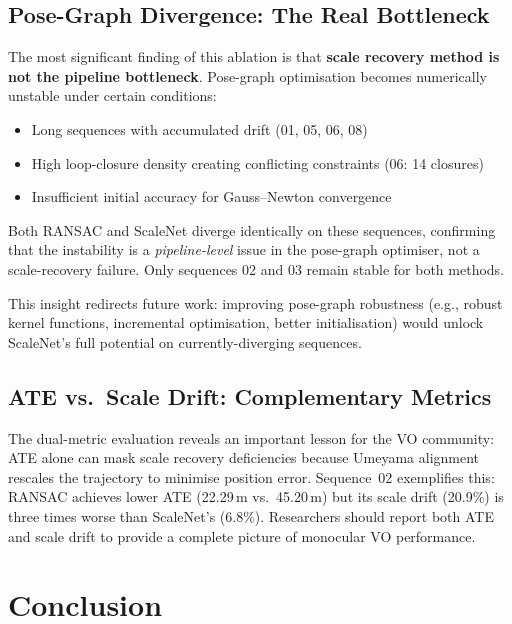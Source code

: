 \documentclass[12pt,a4paper]{article}
\begin{document}
\subsection{Pose-Graph Divergence: The Real Bottleneck}

The most significant finding of this ablation is that \textbf{scale recovery method is not the pipeline bottleneck}. Pose-graph optimisation becomes numerically unstable under certain conditions:
\begin{itemize}
    \item Long sequences with accumulated drift (01, 05, 06, 08)
    \item High loop-closure density creating conflicting constraints (06: 14 closures)
    \item Insufficient initial accuracy for Gauss--Newton convergence
\end{itemize}

Both RANSAC and ScaleNet diverge identically on these sequences, confirming that the instability is a \textit{pipeline-level} issue in the pose-graph optimiser, not a scale-recovery failure. Only sequences 02 and 03 remain stable for both methods.

This insight redirects future work: improving pose-graph robustness (e.g., robust kernel functions, incremental optimisation, better initialisation) would unlock ScaleNet's full potential on currently-diverging sequences.

\subsection{ATE vs.\ Scale Drift: Complementary Metrics}

The dual-metric evaluation reveals an important lesson for the VO community: ATE alone can mask scale recovery deficiencies because Umeyama alignment rescales the trajectory to minimise position error. Sequence~02 exemplifies this: RANSAC achieves lower ATE (22.29\,m vs.\ 45.20\,m) but its scale drift (20.9\%) is three times worse than ScaleNet's (6.8\%). Researchers should report both ATE and scale drift to provide a complete picture of monocular VO performance.

\section{Conclusion}
\end{document}
